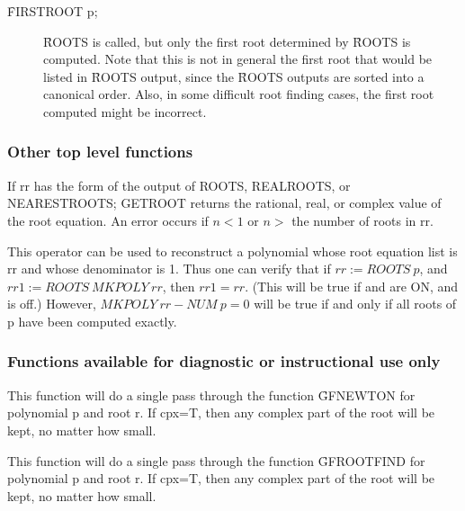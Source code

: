 \begin{description}
\hypertarget{operator:FIRSTROOT}{}
\item[\f{FIRSTROOT} p;] \f{ROOTS} is called, but only the first root determined by
\f{ROOTS} is computed.  Note that this is not in general the first root that
would be listed in \f{ROOTS} output, since the \f{ROOTS} outputs are sorted into
a canonical order.  Also, in some difficult root finding cases, the first
root computed might be incorrect.
\end{description}


\subsubsection{Other top level functions}

\begin{description}
   
\hypertarget{operator:GETROOT}{}  
\item[\f{GETROOT}(n,rr);] If rr has the form of the output of ROOTS, REALROOTS,
or NEARESTROOTS; GETROOT returns the rational, real, or complex value of
the root equation.  An error occurs if $n<1$ or $n>$ the number of roots in
rr.

\hypertarget{operator:MKPOLY}{}
\item[\f{MKPOLY} rr;] This operator can be used to reconstruct a polynomial
whose root equation list is rr and whose denominator is 1.  Thus one can
verify that if $rr := ROOTS~p$, and $rr1 := ROOTS~MKPOLY~rr$, then
$rr1 = rr$. (This will be true if  and  are ON,
and  is off.)
However, $MKPOLY~rr - NUM~p = 0$ will be true if and only if all roots of p
have been computed exactly.
\end{description}

\subsubsection{Functions available for diagnostic or instructional use only}
\hypertarget{operator:GFNEWT}{}
\hypertarget{operator:GFROOT}{}
\begin{description}
\item[\f{GFNEWT}(p,r,cpx);] This function will do a single pass through the
function \f{GFNEWTON} for polynomial p and root r.  If cpx=T, then any
complex part of the root will be kept, no matter how small.

\item[\f{GFROOT}(p,r,cpx);] This function will do a single pass through the
function \f{GFROOTFIND} for polynomial p and root r.  If cpx=T, then any
complex part of the root will be kept, no matter how small.
\end{description}

